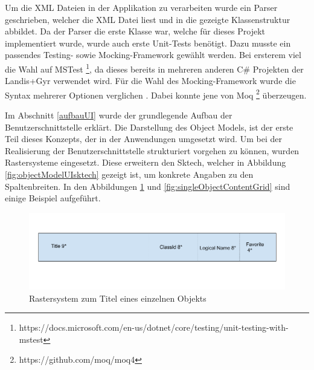 Um die XML Dateien in der Applikation zu verarbeiten wurde ein Parser geschrieben, welcher die XML Datei liest und in die gezeigte Klassenstruktur abbildet.
Da der Parser die erste Klasse war, welche für dieses Projekt implementiert wurde, wurde auch erste Unit-Tests benötigt.
Dazu musste ein passendes Testing- sowie Mocking-Framework gewählt werden.
Bei ersterem viel die Wahl auf MSTest \footnote{https://docs.microsoft.com/en-us/dotnet/core/testing/unit-testing-with-mstest}, da dieses bereits in mehreren anderen C\# Projekten der Landis+Gyr verwendet wird.
Für die Wahl des Mocking-Framework wurde die Syntax mehrerer Optionen verglichen \parencite{clarke_2020}.
Dabei konnte jene von Moq \footnote{https://github.com/moq/moq4} überzeugen.

Im Abschnitt \ref{aufbauUI} wurde der grundlegende Aufbau der Benutzerschnittstelle erklärt.
Die Darstellung des Object Models, ist der erste Teil dieses Konzepts, der in der Anwendungen umgesetzt wird.
Um bei der Realisierung der Benutzerschnittstelle strukturiert vorgehen zu können, wurden Rastersysteme eingesetzt.
Diese erweitern den Sktech, welcher in Abbildung \ref{fig:objectModelUIsktech} gezeigt ist, um konkrete Angaben zu den Spaltenbreiten.
In den Abbildungen \ref{fig:singleObjectTitleGrid} und \ref{fig:singleObjectContentGrid} sind einige Beispiel aufgeführt.

\begin{figure}
   \centering
   \includegraphics[width=1.0\textwidth]{gfx/Single Object Title Line Grid.png}
   \caption{
      Rastersystem zum Titel eines einzelnen Objekts
      }
      \label{fig:singleObjectTitleGrid}
\end{figure}


